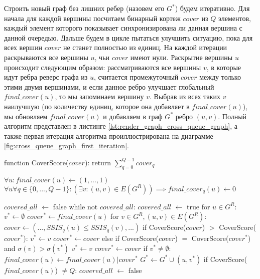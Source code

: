 Строить новый граф без лишних ребер (назовем его $G^*$) будем итеративно. Для начала для каждой вершины посчитаем бинарный кортеж $cover$ из $Q$ элементов, каждый элемент которого показывает синхронизирована ли данная вершина с данной очередью. Дальше будем в цикле пытаться улучшить ситуацию, пока для всех вершин $cover$ не станет полностью из единиц. На каждой итерации раскрываются все вершины $u$, чьи $cover$ имеют нули. Раскрытие вершины $u$ происходит следующим образом: рассматриваются все вершины $v$, в которые идут ребра реверс графа из $u$, считается промежуточный $cover$ между только этими двумя вершинами, и если данное ребро улучшает глобальный $final\_cover(u)$, то мы запоминаем вершину $v$. Выбрав из всех таких $v$ наилучшую (по количеству единиц, которое она добавляет в $final\_cover(u)$), мы обновляем $final\_cover(u)$ и добавляем в граф $G^*$ ребро $(u, v)$. Полный алгоритм представлен в листинге \ref{lst:render_graph_cross_queue_graph}, а также первая итерация алгоритма проиллюстрирована на диаграмме \ref{fig:cross_queue_graph_first_iteration}.

\begin{minipage}[t]{0.95\textwidth}
    \centering
    \begin{pseudocode}[mathescape=true, caption={Построение графа $G^*$ с достаточным минимальным набором ребер для межочередной синхронизации}, label={lst:render_graph_cross_queue_graph}]

    function CoverScore($cover$):
        return $\sum_{q=0}^{Q-1} cover_q$

    $\forall u: final\_cover(u) \leftarrow (1, ..., 1)$
    $\forall u \forall q \in\{0, ..., Q-1\}: (\exists v: (u, v) \in E(G^R)) \implies final\_cover_q(u) \leftarrow 0$

    $covered\_all$ $\leftarrow$ false
    while not $covered\_all$:
        $covered\_all$ $\leftarrow$ true
        for $u \in G^R$:
            $v^* \leftarrow \emptyset$
            $cover^* \leftarrow final\_cover(u)$
            for $v \in G^R, (u, v) \in E(G^R)$:
                $cover \leftarrow (..., SSIS_q(u) \leq SSIS_q(v), ...)$
                if CoverScore($cover$) $>$ CoverScore($cover^*$):
                    $v^* \leftarrow v$
                    $cover^* \leftarrow cover$
                else if CoverScore($cover$) $=$ CoverScore($cover^*$) and $\sigma(v) > \sigma(v^*)$
                    $v^* \leftarrow v$
                    $cover^* \leftarrow cover$
            if $v^* \neq \emptyset$:
                $final\_cover(u) \leftarrow final\_cover(u) | cover^*$
                $G^* \leftarrow G^* \cup (u, v^*)$
            if CoverScore($final\_cover(u)$) $\neq Q$:
                $covered\_all$ $\leftarrow$ false
    \end{pseudocode}
\end{minipage}

